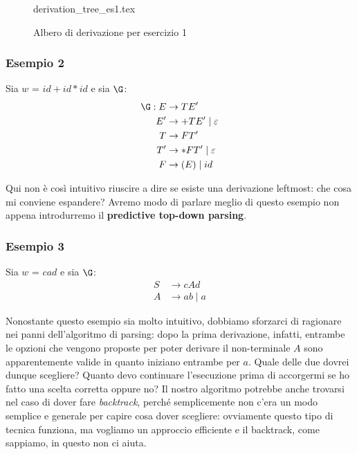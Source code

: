 \documentclass[class=book, crop=false, oneside, 12pt]{standalone}
\begin{document}
\begin{figure}[H]
    \centering
    {derivation_tree_es1.tex}
    \caption{Albero di derivazione per esercizio 1}
    \label{par-td-es1}
\end{figure}

\subsubsection{Esempio 2}
Sia \(w\) = \(id + id * id\) e sia \(\G\):
\begin{align*}
    \G: E &\rightarrow TE' \\
    E' &\rightarrow +TE' \mid \varepsilon \\
    T &\rightarrow FT' \\
    T' &\rightarrow *FT' \mid \varepsilon \\
    F &\rightarrow (E) \mid id
\end{align*}

Qui non è così intuitivo riuscire a dire se esiste una derivazione leftmost: che cosa mi conviene espandere? Avremo modo di parlare meglio di questo esempio non appena introdurremo il \textbf{predictive top-down parsing}.

\subsubsection{Esempio 3}
Sia \(w\) = \(cad\) e sia \(\G\):
\begin{align*}
    S &\rightarrow cAd \\
    A &\rightarrow ab \mid a
\end{align*}

Nonostante questo esempio sia molto intuitivo, dobbiamo sforzarci di ragionare nei panni dell'algoritmo di parsing: dopo la prima derivazione, infatti, entrambe le opzioni che vengono proposte per poter derivare il non-terminale \(A\) sono apparentemente valide in quanto iniziano entrambe per \(a\). Quale delle due dovrei dunque scegliere? Quanto devo continuare l'esecuzione prima di accorgermi se ho fatto una scelta corretta oppure no? Il nostro algoritmo potrebbe anche trovarsi nel caso di dover fare \emph{backtrack}, perché semplicemente non c'era un modo semplice e generale per capire cosa dover scegliere: ovviamente questo tipo di tecnica funziona, ma vogliamo un approccio efficiente e il backtrack, come sappiamo, in questo non ci aiuta.
\end{document}
